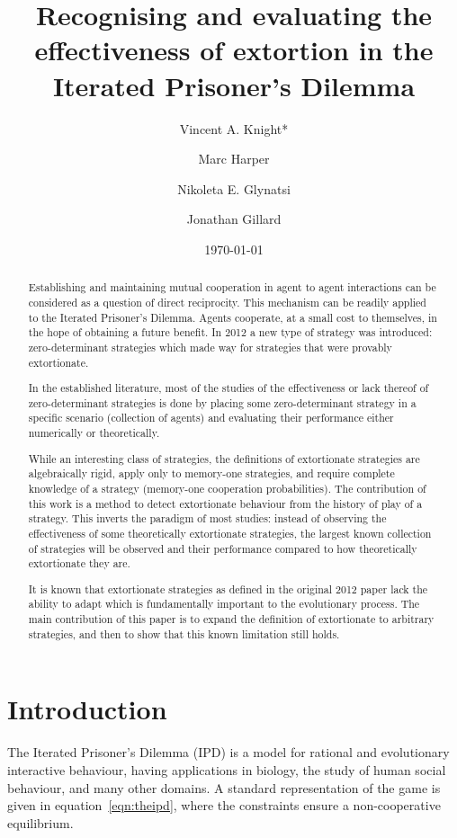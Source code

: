 \documentclass[a4paper]{article}
\title{Recognising and evaluating the effectiveness
       of extortion in the Iterated Prisoner's Dilemma}
\author[1]{Vincent A. Knight*}
\author[2]{Marc Harper}
\author[1]{Nikoleta E. Glynatsi}
\author[1]{Jonathan Gillard}
\affil[1]{Cardiff University, School of Mathematics, Cardiff, United Kingdom}
\affil[2]{Google Inc., Mountain View, CA, United States of America}
\date{\today}
\begin{document}
\maketitle

\begin{abstract}

Establishing and maintaining mutual cooperation in agent to agent interactions
can be considered as a question of direct reciprocity. This mechanism can be
readily applied to the Iterated Prisoner's Dilemma. Agents cooperate, at a
small cost to themselves, in the hope of obtaining a future benefit. In 2012
a new type of strategy was introduced: zero-determinant strategies which
made way for strategies that were provably extortionate.

In the established literature, most of the studies of the effectiveness or lack
thereof of zero-determinant strategies is done by placing some
zero-determinant strategy in a specific scenario (collection of agents) and
evaluating their performance either numerically or theoretically.

While an interesting class of strategies, the definitions of extortionate
strategies are algebraically rigid, apply only to memory-one strategies, and
require complete knowledge of a strategy (memory-one cooperation
probabilities). The contribution of this work is a method to detect
extortionate behaviour from the history of play of a strategy. This inverts
the paradigm of most studies: instead of observing the effectiveness of some
theoretically extortionate strategies, the largest known collection of
strategies will be observed and their performance compared to how
theoretically extortionate they are.

It is known that extortionate strategies as defined in the original 2012 paper
lack the ability to adapt which is fundamentally important to the
evolutionary process.  The main contribution of this paper is to expand the
definition of extortionate to arbitrary strategies, and then to show that
this known limitation still holds.
\end{abstract}

\section{Introduction}

The Iterated Prisoner's Dilemma (IPD) is a model for rational and evolutionary
interactive behaviour, having applications in biology, the study of human social
behaviour, and many other domains. A standard representation  of the game is
given in equation~\ref{eqn:theipd}, where the constraints ensure a
non-cooperative equilibrium.
\end{document}

